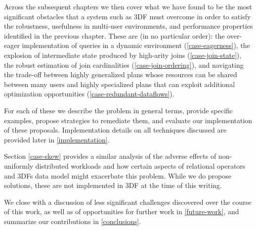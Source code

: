 \documentclass[../index.tex]{subfiles}
\begin{document}
Across the subsequent chapters we then cover what we have found to be
the most significant obstacles that a system such as 3DF must overcome
in order to satisfy the robustness, usefulness in multi-user
environments, and performance properties identified in the previous
chapter. These are (in no particular order): the over-eager
implementation of queries in a dynamic environment
(\autoref{case-eagerness}), the explosion of intermediate state
produced by high-arity joins (\autoref{case-join-state}), the robust
estimation of join cardinalities (\autoref{case-join-ordering}), and
navigating the trade-off between highly generalized plans whose
resources can be shared between many users and highly specialized
plans that can exploit additional optimization opportunities
(\autoref{case-redundant-dataflows}).

For each of these we describe the problem in general terms, provide
specific examples, propose strategies to remediate them, and evaluate
our implementation of these proposals. Implementation details on all
techniques discussed are provided later in \autoref{implementation}.

Section \ref{case-skew} provides a similar analysis of the adverse
effects of non-uniformly distributed workloads and how certain aspects
of relational operators and 3DFs data model might exacerbate this
problem. While we do propose solutions, these are not implemented in
3DF at the time of this writing.

We close with a discussion of less significant challenges discovered
over the course of this work, as well as of opportunities for further
work in \autoref{future-work}, and summarize our contributions in
\autoref{conclusions}.
\end{document}
